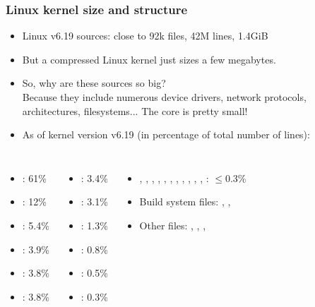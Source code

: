 \begin{frame}
  \frametitle{Linux kernel size and structure}
  \begin{itemize}
  \item Linux v6.19 sources: close to 92k files, 42M lines, 1.4GiB
  \item But a compressed Linux kernel just sizes a few megabytes.
  \item So, why are these sources so big?\\
    Because they include numerous device drivers, network protocols,
    architectures, filesystems... The core is pretty small!
  \item As of kernel version v6.19 (in percentage of total number of lines):
  \end{itemize}
  {\small
  \begin{columns}
    \begin{itemize}
    \item {}: 61\%
    \item {}: 12\%
    \item {}: 5.4\%
    \item {}: 3.9\%
    \item {}: 3.8\%
    \item {}: 3.8\%
    \end{itemize}
    \begin{itemize}
    \item {}: 3.4\%
    \item {}: 3.1\%
    \item {}: 1.3\%
    \item {}: 0.8\%
    \item {}: 0.5\%
    \item {}: 0.3\%
    \end{itemize}
    \begin{itemize}
    \item {}, , , ,
      , , , ,
      , , , : $\leq$0.3\%
    \item Build system files: , , 
    \item Other files: , ,
      , 
    \end{itemize}
  \end{columns}
  }
\end{frame}
